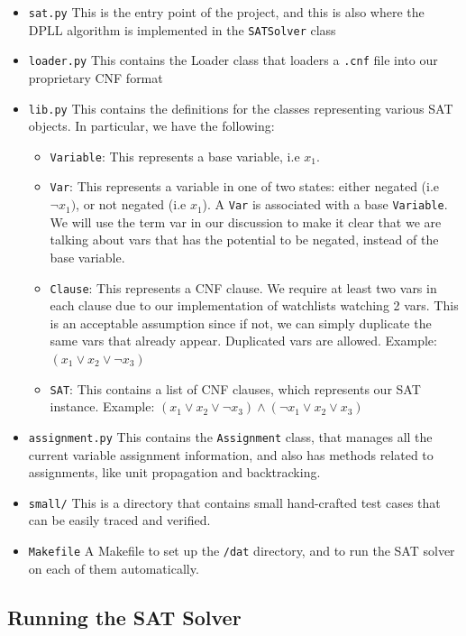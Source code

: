 \documentclass[11pt]{article}
\begin{document}
\begin{itemize}
  \item \texttt{sat.py} This is the entry point of the project, and this is also where the DPLL algorithm is implemented  in the \texttt{SATSolver} class
  \item \texttt{loader.py} This contains the \textsf{Loader} class that loaders a \texttt{.cnf} file into our proprietary CNF format
  \item \texttt{lib.py} This contains the definitions for the classes representing various SAT objects. In particular, we have the following:
    \begin{itemize}
      \item \texttt{Variable}: This represents a base variable, i.e $x_1$.
      \item \texttt{Var}: This represents a variable in one of two states: either negated (i.e $\neg x_1)$, or not negated (i.e $x_1$). A \texttt{Var} is associated with a base \texttt{Variable}. We will use the term var in our discussion to make it clear that we are talking about vars that has the potential to be negated, instead of the base variable.
      \item \texttt{Clause}: This represents a CNF clause. We require at least two vars in each clause due to our implementation of watchlists watching 2 vars. This is an acceptable assumption since if not, we can simply duplicate the same vars that already appear. Duplicated vars are allowed. Example: $(x_1 \vee x_2 \vee \neg x_3)$
      \item \texttt{SAT}: This contains a list of CNF clauses, which represents our SAT instance. Example: $(x_1 \vee x_2 \vee \neg x_3) \wedge (\neg x_1 \vee x_2 \vee x_3)$
    \end{itemize}
  \item \texttt{assignment.py} This contains the \texttt{Assignment} class, that manages all the current variable assignment information, and also has methods related to assignments, like unit propagation and backtracking.
  \item \texttt{small/} This is a directory that contains small hand-crafted test cases that can be easily traced and verified.
  \item \texttt{Makefile} A Makefile to set up the \texttt{/dat} directory, and to run the SAT solver on each of them automatically.
\end{itemize}

\subsection{Running the SAT Solver}
\end{document}

